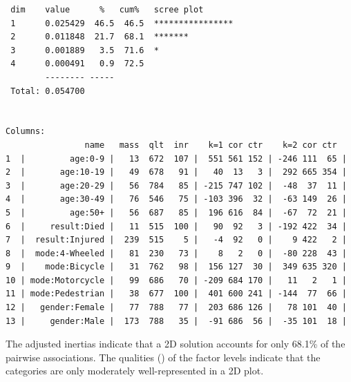 \documentclass[10pt]{report}\usepackage[]{graphicx}\usepackage[]{color}
\makeatletter
\newenvironment{kframe}{%
 \def\at@end@of@kframe{}%
 \ifinner\ifhmode%
  \def\at@end@of@kframe{\end{minipage}}%
  \begin{minipage}{\columnwidth}%
 \fi\fi%
 \def\FrameCommand##1{\hskip\@totalleftmargin \hskip-\fboxsep
 \colorbox{shadecolor}{##1}\hskip-\fboxsep
     \hskip-\linewidth \hskip-\@totalleftmargin \hskip\columnwidth}%
 \MakeFramed {\advance\hsize-\width
   \@totalleftmargin\z@ \linewidth\hsize
   \@setminipage}}%
 {\par\unskip\endMakeFramed%
 \at@end@of@kframe}
\newenvironment{knitrout}{}{} %
\renewenvironment{knitrout}{\small\renewcommand{\baselinestretch}{.85}}{} %
\makeatother
\begin{document}
\begin{Exercises}
\begin{enumerate*}
\begin{ans}
\begin{knitrout}
\begin{kframe}
\begin{verbatim}
 dim    value      %   cum%   scree plot               
 1      0.025429  46.5  46.5  ****************         
 2      0.011848  21.7  68.1  *******                  
 3      0.001889   3.5  71.6  *                        
 4      0.000491   0.9  72.5                           
        -------- -----                                 
 Total: 0.054700                                       


Columns:
                name   mass  qlt  inr    k=1 cor ctr    k=2 cor ctr  
1  |         age:0-9 |   13  672  107 |  551 561 152 | -246 111  65 |
2  |       age:10-19 |   49  678   91 |   40  13   3 |  292 665 354 |
3  |       age:20-29 |   56  784   85 | -215 747 102 |  -48  37  11 |
4  |       age:30-49 |   76  546   75 | -103 396  32 |  -63 149  26 |
5  |         age:50+ |   56  687   85 |  196 616  84 |  -67  72  21 |
6  |     result:Died |   11  515  100 |   90  92   3 | -192 422  34 |
7  |  result:Injured |  239  515    5 |   -4  92   0 |    9 422   2 |
8  |  mode:4-Wheeled |   81  230   73 |    8   2   0 |  -80 228  43 |
9  |    mode:Bicycle |   31  762   98 |  156 127  30 |  349 635 320 |
10 | mode:Motorcycle |   99  686   70 | -209 684 170 |   11   2   1 |
11 | mode:Pedestrian |   38  677  100 |  401 600 241 | -144  77  66 |
12 |   gender:Female |   77  788   77 |  203 686 126 |   78 101  40 |
13 |     gender:Male |  173  788   35 |  -91 686  56 |  -35 101  18 |
\end{verbatim}
\end{kframe}
\end{knitrout}
    The adjusted inertias indicate that a 2D solution accounts for only 68.1\% of
    the pairwise associations. The qualities () of the factor levels indicate
    that the categories are only moderately well-represented in a 2D plot.
    \end{ans}
    

\end{enumerate*}
\end{Exercises}
\end{document}
